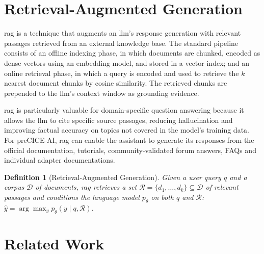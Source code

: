 \documentclass[
  numbers=noenddot,
  english,
  a4paper,
  twoside,
  bibliography=totoc,
  headsepline,
  cleardoublepage=empty,
  parskip=half,
  draft=false
]{scrbook}
\theoremstyle{break}
\newtheorem{definition}{Definition}[chapter]
\renewcommand{\_}{\textunderscore\allowbreak}
\begin{document}
\section{Retrieval-Augmented Generation}\label{sec:background:rag}

\Gls{rag} \cite{lewis2020rag} is a technique that augments an \gls{llm}'s response generation
with relevant passages retrieved from an external knowledge base.
The standard pipeline consists of an offline indexing phase, in which documents are chunked,
encoded as dense vectors using an embedding model, and stored in a vector index; and an online
retrieval phase, in which a query is encoded and used to retrieve the $k$ nearest document
chunks by cosine similarity.
The retrieved chunks are prepended to the \gls{llm}'s context window as grounding evidence.

\gls{rag} is particularly valuable for domain-specific question answering because it allows the
\gls{llm} to cite specific source passages, reducing hallucination and improving factual accuracy
on topics not covered in the model's training data.
For preCICE-AI, \gls{rag} can enable the assistant to generate its responses from the official
documentation, tutorials, community-validated forum answers, FAQs and individual adapter documentations.

\begin{definition}[Retrieval-Augmented Generation]
  Given a user query $q$ and a corpus $\mathcal{D}$ of documents, \gls{rag} retrieves a set
  $\mathcal{R} = \{d_1, \ldots, d_k\} \subseteq \mathcal{D}$ of relevant passages and conditions
  the language model $p_\theta$ on both $q$ and $\mathcal{R}$:
  $\hat{y} = \arg\max_y p_\theta(y \mid q, \mathcal{R})$.
\end{definition}


\section{Related Work}\label{sec:background:related}
\end{document}
